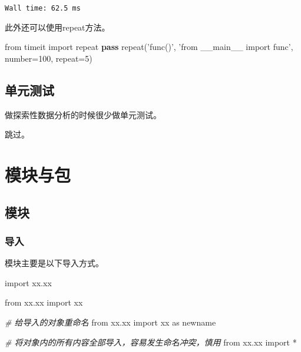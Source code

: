 \documentclass[12pt]{ctexart}
\newenvironment{Shaded}{}{}
\newcommand{\DecValTok}[1]{\textcolor[rgb]{0.25,0.63,0.44}{{#1}}}
\newcommand{\StringTok}[1]{\textcolor[rgb]{0.25,0.44,0.63}{{#1}}}
\newcommand{\CommentTok}[1]{\textcolor[rgb]{0.38,0.63,0.69}{\textit{{#1}}}}
\newcommand{\NormalTok}[1]{{#1}}
\newcommand{\ImportTok}[1]{{#1}}
\newcommand{\ControlFlowTok}[1]{\textcolor[rgb]{0.00,0.44,0.13}{\textbf{{#1}}}}
\newcommand{\OperatorTok}[1]{\textcolor[rgb]{0.40,0.40,0.40}{{#1}}}
\begin{document}
    \begin{Verbatim}[commandchars=\\\{\}]
Wall time: 62.5 ms

    \end{Verbatim}

    此外还可以使用repeat方法。

\begin{Shaded}
\begin{Highlighting}[]
\ImportTok{from}\NormalTok{ timeit }\ImportTok{import}\NormalTok{ repeat}
\ControlFlowTok{pass}
\NormalTok{repeat(}\StringTok{'func()'}\NormalTok{, }\StringTok{'from __main__ import func'}\NormalTok{, number}\OperatorTok{=}\DecValTok{100}\NormalTok{, repeat}\OperatorTok{=}\DecValTok{5}\NormalTok{)}
\end{Highlighting}
\end{Shaded}

    \hypertarget{ux5355ux5143ux6d4bux8bd5}{%
\subsection{单元测试}\label{ux5355ux5143ux6d4bux8bd5}}

做探索性数据分析的时候很少做单元测试。

跳过。

    \hypertarget{ux6a21ux5757ux4e0eux5305}{%
\section{模块与包}\label{ux6a21ux5757ux4e0eux5305}}

    \hypertarget{ux6a21ux5757}{%
\subsection{模块}\label{ux6a21ux5757}}

    \hypertarget{ux5bfcux5165}{%
\subsubsection{导入}\label{ux5bfcux5165}}

模块主要是以下导入方式。

\begin{Shaded}
\begin{Highlighting}[]
\ImportTok{import}\NormalTok{ xx.xx}

\ImportTok{from}\NormalTok{ xx.xx }\ImportTok{import}\NormalTok{ xx}

\CommentTok{# 给导入的对象重命名}
\ImportTok{from}\NormalTok{ xx.xx }\ImportTok{import}\NormalTok{ xx }\ImportTok{as}\NormalTok{ newname}

\CommentTok{# 将对象内的所有内容全部导入，容易发生命名冲突，慎用}
\ImportTok{from}\NormalTok{ xx.xx }\ImportTok{import} \OperatorTok{*}
\end{Highlighting}
\end{Shaded}
\end{document}
